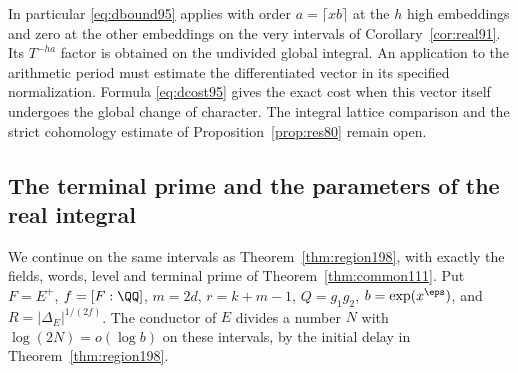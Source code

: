 \documentclass[a4paper,11pt]{article}
\theoremstyle{definition}
\theoremstyle{remark}
\numberwithin{equation}{section}
\begin{document}
In particular \eqref{eq:dbound95} applies with order \(a=\lceil xb\rceil\)
at the \(h\) high embeddings and zero at the other embeddings on
the very intervals of Corollary~\ref{cor:real91}. Its \(T^{-ha}\)
factor is obtained on the undivided global integral. An application
to the arithmetic period must estimate the differentiated vector
in its specified normalization. Formula \eqref{eq:dcost95} gives
the exact cost when this vector itself undergoes the global change
of character. The integral lattice comparison and the strict
cohomology estimate of Proposition~\ref{prop:res80} remain open.

\subsection{The terminal prime and the parameters of the real integral}\label{nav:VII-31}
We continue on the same intervals as Theorem~\ref{thm:region198},
with exactly the fields, words, level and terminal prime of
Theorem~\ref{thm:common111}. Put \(F=E^+\), \(f=[F:\QQ]\),
\(m=2d\), \(r=k+m-1\), \(Q=g_1g_2\), \(b=\exp(x^\eps)\),
and \(R=|\Delta_E|^{1/(2f)}\). The conductor of \(E\) divides
a number \(N\) with \(\log(2N)=o(\log b)\) on these intervals,
by the initial delay in Theorem~\ref{thm:region198}.
\end{document}
